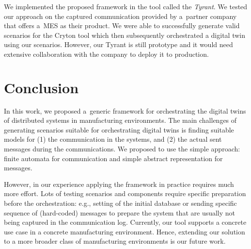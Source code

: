 {We implemented the proposed framework in the tool called the \emph{Tyrant}.  
%
We tested our approach on the captured communication provided by a~partner
company that offers a~MES as their product. We were able to successfully
generate valid scenarios for the Cryton tool which then subsequently
orchestrated a digital twin using our scenarios.
However, our Tyrant is still prototype and it would need extensive collaboration
with the company to deploy it to production.
%

\section{Conclusion}

In this work, we proposed a~generic framework for orchestrating the digital
twins of distributed systems in manufacturing environments. 
%
The main challenges of generating scenarios suitable for orchestrating digital
twins is finding suitable models for (1) the communication in the systems, and
(2) the actual sent messages during the communications.
%
We proposed to use the simple approach: finite automata for communication and
simple abstract representation for messages.

However, in our experience applying the framework in practice requires much
more effort. 
%
Lots of testing scenarios and components require specific preparation before
the orchestration: e.g., setting of the initial database or sending specific
sequence of (hard-coded) messages to prepare the system that are usually not
being captured in the communication log.
%
Currently, our tool supports a concrete use case in a concrete manufacturing
environment.
%
Hence, extending our solution to a more broader class of manufacturing
environments is our future work.

}

